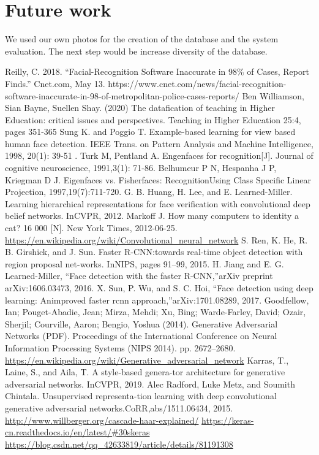 \documentclass[conference]{IEEEtran}
\begin{document}
\section{Future work}
We used our own photos for the creation of the database and the system evaluation. The next step would be increase diversity of the database. 


\begin{thebibliography}{00}
 Reilly, C. 2018. “Facial-Recognition Software Inaccurate in 98\% of Cases, Report Finds.” Cnet.com, May 13. https://www.cnet.com/news/facial-recognition-software-inaccurate-in-98-of-metropolitan-police-cases-reports/
 Ben Williamson, Sian Bayne, Suellen Shay. (2020) The datafication of teaching in Higher Education: critical issues and perspectives. Teaching in Higher Education 25:4, pages 351-365
 Sung K. and Poggio T. Example-based learning for view based human face detection. IEEE Trans. on Pattern Analysis and Machine Intelligence, 1998, 20(1): 39-51 .
 Turk M, Pentland A. Engenfaces for recognition[J]. Journal of cognitive neuroscience, 1991,3(1): 71-86.
 Belhumeur P N, Hespanha J P, Kriegman D J.  Eigenfaces vs. Fisherfaces: RecognitionUsing Class Specific Linear Projection, 1997,19(7):711-720.
 G. B. Huang, H. Lee, and E. Learned-Miller. Learning hierarchical representations for face verification with convolutional deep belief networks. InCVPR, 2012.
 Markoff J. How many computers to identity a cat? 16 000 [N]. New York Times, 2012-06-25.
\url{https://en.wikipedia.org/wiki/Convolutional_neural_network}
 S. Ren, K. He, R. B. Girshick, and J. Sun. Faster R-CNN:towards real-time object detection with region proposal net-works. InNIPS, pages 91–99, 2015.
 H. Jiang and E. G. Learned-Miller, “Face detection with the faster R-CNN,”arXiv preprint arXiv:1606.03473, 2016.
 X. Sun, P. Wu, and S. C. Hoi, “Face detection using deep learning: Animproved faster rcnn approach,”arXiv:1701.08289, 2017.
 Goodfellow, Ian; Pouget-Abadie, Jean; Mirza, Mehdi; Xu, Bing; Warde-Farley, David; Ozair, Sherjil; Courville, Aaron; Bengio, Yoshua (2014). Generative Adversarial Networks (PDF). Proceedings of the International Conference on Neural Information Processing Systems (NIPS 2014). pp. 2672–2680.
 \url{https://en.wikipedia.org/wiki/Generative_adversarial_network}
 Karras, T., Laine, S., and Aila, T. A style-based genera-tor architecture for generative adversarial networks. InCVPR, 2019.
 Alec Radford, Luke Metz, and Soumith Chintala. Unsupervised representa-tion learning with deep convolutional generative adversarial networks.CoRR,abs/1511.06434, 2015.
 \url{http://www.willberger.org/cascade-haar-explained/}
 \url{https://keras-cn.readthedocs.io/en/latest/#30skeras}
 \url{https://blog.csdn.net/qq_42633819/article/details/81191308}


\end{thebibliography}
\end{document}
